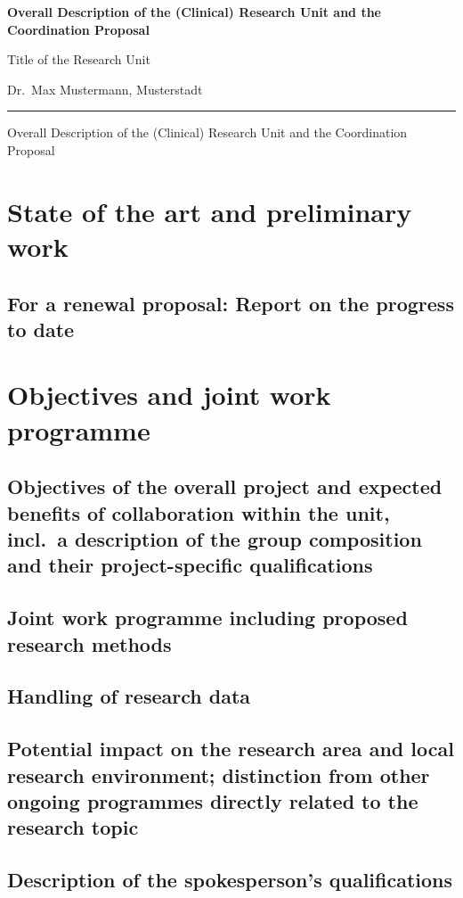 \documentclass{scrartcl}
\newcommand{\spokesperson}{Dr.\ Max Mustermann, Musterstadt}
\newcommand{\project}{Title of the Research Unit}
\begin{document}
{\raggedright{} \normalsize \bfseries
	Overall Description of the (Clinical) Research Unit and the Coordination Proposal \par
    \project{} \par
    \spokesperson{} \par
	\rule{\textwidth}{0.5pt} \par
	Overall Description of the (Clinical) Research Unit and the Coordination Proposal
}

\section{State of the art and preliminary work}

\subsection{For a renewal proposal: Report on the progress to date}


\section{Objectives and joint work programme}

\subsection{Objectives of the overall project and expected benefits of collaboration within the unit, incl.\ a description of the group composition and their project-specific qualifications}

\subsection{Joint work programme including proposed research methods}

\subsection{Handling of research data}

\subsection{Potential impact on the research area and local research environment; distinction from other ongoing programmes directly related to the research topic}

\subsection{Description of the spokesperson's qualifications}
\end{document}
